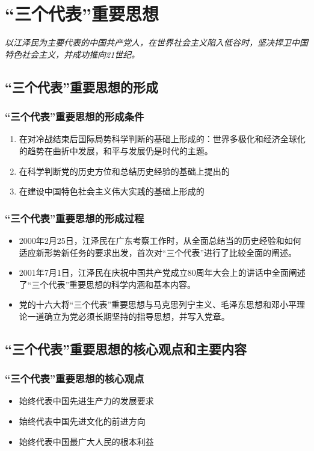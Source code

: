\chapter{“三个代表”重要思想}
\emph{以江泽民为主要代表的中国共产党人，在世界社会主义陷入低谷时，坚决捍卫中国特色社会主义，并成功推向21世纪。}


\section{“三个代表”重要思想的形成}
    \subsection{“三个代表”重要思想的形成条件}
        \begin{enumerate}
            \item 在对冷战结束后国际局势科学判断的基础上形成的：世界多极化和经济全球化的趋势在曲折中发展，和平与发展仍是时代的主题。
            \item 在科学判断党的历史方位和总结历史经验的基础上提出的
            \item 在建设中国特色社会主义伟大实践的基础上形成的
        \end{enumerate}

    \subsection{“三个代表”重要思想的形成过程}
        \begin{itemize}
            \item 2000年2月25日，江泽民在广东考察工作时，从全面总结当的历史经验和如何适应新形势新任务的要求出发，首次对“三个代表”进行了比较全面的阐述。
            \item 2001年7月1日，江泽民在庆祝中国共产党成立80周年大会上的讲话中全面阐述了“三个代表”重要思想的科学内涵和基本内容。
            \item 党的十六大将“三个代表”重要思想与马克思列宁主义、毛泽东思想和邓小平理论一道确立为党必须长期坚持的指导思想，并写入党章。
        \end{itemize}


\section{“三个代表”重要思想的核心观点和主要内容}

    \subsection{“三个代表”重要思想的核心观点}
        \begin{itemize}
            \item 始终代表中国先进生产力的发展要求
            \item 始终代表中国先进文化的前进方向
            \item 始终代表中国最广大人民的根本利益
        \end{itemize}

